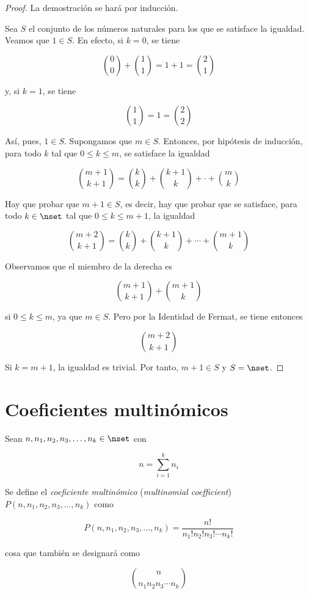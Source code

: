 \begin{proof}
  La demostración se hará por inducción.

  Sea $S$ el conjunto de los números naturales para los que se satisface la
  igualdad. Veamos que $1 \in S$. En efecto, si $k = 0$, se tiene

  $$ {0 \choose 0} + {1 \choose 1} = 1 + 1 = {2 \choose 1} $$

  \noindent y, si $k = 1$, se tiene

  $$ {1 \choose 1} = 1 = {2 \choose 2} $$

  Así, pues, $1 \in S$. Supongamos que $m \in S$. Entonces, por hipótesis de
  inducción, para todo $k$ tal que $0 \leq k \leq m$, se satisface la
  igualdad

  $$ {m+1 \choose k+1} = {k \choose k} + {k+1 \choose k} + \cdot + {m
  \choose k} $$


  Hay que probar que $m+1 \in S$, es decir, hay que probar que se satisface,
  para todo $k \in \nset$ tal que $0 \leq k \leq m+1$, la igualdad

  $$ {m+2 \choose k+1} = {k \choose k} + {k+1 \choose k} + \cdots + {m+1
  \choose k} $$

  Observamos que el miembro de la derecha es

  $$ {m+1 \choose k+1} + {m+1 \choose k} $$

  \noindent si $0 \leq k \leq m$, ya que $m \in S$. Pero por la Identidad de
  Fermat, se tiene entonces

  $$ {m+2 \choose k+1} $$

  \noindent Si $k = m+1$, la igualdad es trivial. Por tanto, $m+1 \in S$ y
  $S = \nset$.
\end{proof}







\section{Coeficientes multinómicos}

\begin{deffinition}
  Sean $n, n_1, n_2, n_3, \ldots, n_k \in \nset$ con

  $$ n = \sum_{i=1}^k n_i$$

  \noindent Se define el \emph{coeficiente multinómico} (\emph{multinomial
  coefficient}) $P(n, n_1, n_2, n_3, \ldots, n_k)$ como

  $$ P(n, n_1, n_2, n_3, \ldots, n_k) = \frac{n!}{{n_1}!{n_2}!{n_3}! \cdots
  {n_k}!} $$

  \noindent cosa que también se designará como

  $$ {n \choose {{n_1} {n_2} {n_3} \cdots {n_k}}} $$
\end{deffinition}

